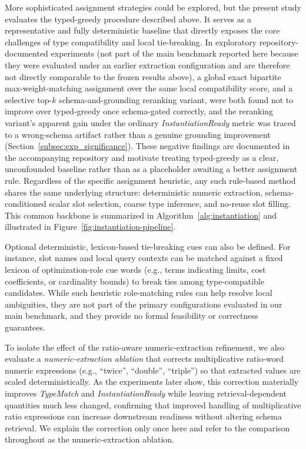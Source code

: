 \documentclass[3p]{elsarticle}
\begin{document}
More sophisticated assignment strategies could be explored, but the present study evaluates the typed-greedy procedure described above. It serves as a representative and fully deterministic baseline that directly exposes the core challenges of type compatibility and local tie-breaking. In exploratory repository-documented experiments (not part of the main benchmark reported here because they were evaluated under an earlier extraction configuration and are therefore not directly comparable to the frozen results above), a global exact bipartite max-weight-matching assignment over the same local compatibility score, and a selective top-$k$ schema-and-grounding reranking variant, were both found not to improve over typed-greedy once schema-gated correctly, and the reranking variant's apparent gain under the ordinary \textit{InstantiationReady} metric was traced to a wrong-schema artifact rather than a genuine grounding improvement (Section~\ref{subsec:exp_significance}). These negative findings are documented in the accompanying repository and motivate treating typed-greedy as a clear, unconfounded baseline rather than as a placeholder awaiting a better assignment rule. Regardless of the specific assignment heuristic, any such rule-based method shares the same underlying structure: deterministic numeric extraction, schema-conditioned scalar slot selection, coarse type inference, and no-reuse slot filling. This common backbone is summarized in Algorithm~\ref{alg:instantiation} and illustrated in Figure~\ref{fig:instantiation-pipeline}.

Optional deterministic, lexicon-based tie-breaking cues can also be defined. For instance, slot names and local query contexts can be matched against a fixed lexicon of optimization-role cue words (e.g., terms indicating limits, cost coefficients, or cardinality bounds) to break ties among type-compatible candidates. While such heuristic role-matching rules can help resolve local ambiguities, they are not part of the primary configurations evaluated in our main benchmark, and they provide no formal feasibility or correctness guarantees.

To isolate the effect of the ratio-aware numeric-extraction refinement, we also evaluate a \emph{numeric-extraction ablation} that corrects multiplicative ratio-word numeric expressions (e.g., ``twice'', ``double'', ``triple'') so that extracted values are scaled deterministically. As the experiments later show, this correction materially improves \textit{TypeMatch} and \textit{InstantiationReady} while leaving retrieval-dependent quantities much less changed, confirming that improved handling of multiplicative ratio expressions can increase downstream readiness without altering schema retrieval. We explain the correction only once here and refer to the comparison throughout as the numeric-extraction ablation.
\end{document}

